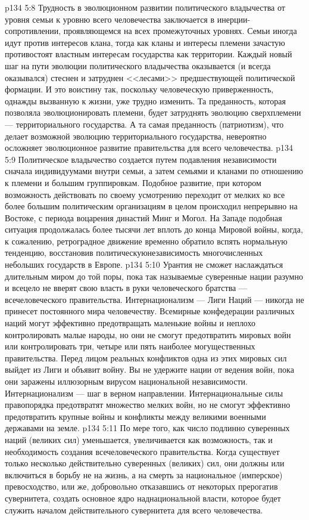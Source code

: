 \vs p134 5:8 Трудность в эволюционном развитии политического владычества от уровня семьи к уровню всего человечества заключается в инерции\hyp{}сопротивлении, проявляющемся на всех промежуточных уровнях. Семьи иногда идут против интересов клана, тогда как кланы и интересы племени зачастую противостоят властным интересам государства как территории. Каждый новый шаг на пути эволюции политического владычества оказывается (и всегда оказывался) стеснен и затруднен <<лесами>> предшествующей политической формации. И это воистину так, поскольку человеческую приверженность, однажды вызванную к жизни, уже трудно изменить. Та преданность, которая позволяла эволюционировать племени, будет затруднять эволюцию сверхплемени --- территориального государства. А та самая преданность (патриотизм), что делает возможной эволюцию территориального государства, невероятно осложняет эволюционное развитие правительства для всего человечества.
\vs p134 5:9 Политическое владычество создается путем подавления независимости сначала индивидуумами внутри семьи, а затем семьями и кланами по отношению к племени и большим группировкам. Подобное развитие, при котором возможность действовать по своему усмотрению переходит от мелких ко все более большим политическим организациям в целом происходил непрерывно на Востоке, с периода воцарения династий Минг и Могол. На Западе подобная ситуация продолжалась более тысячи лет вплоть до конца Мировой войны, когда, к сожалению, ретроградное движение временно обратило вспять нормальную тенденцию, восстановив политическуюнезависимость многочисленных небольших государств в Европе.
\vs p134 5:10 Урантия не сможет наслаждаться длительным миром до той поры, пока так называемые суверенные нации разумно и всецело не вверят свою власть в руки человеческого братства --- всечеловеческого правительства. Интернационализм --- Лиги Наций --- никогда не принесет постоянного мира человечеству. Всемирные конфедерации различных наций могут эффективно предотвращать маленькие войны и неплохо контролировать малые народы, но они не смогут предотвратить мировых войн или контролировать три, четыре или пять наиболее могущественных правительства. Перед лицом реальных конфликтов одна из этих мировых сил выйдет из Лиги и объявит войну. Вы не удержите нации от ведения войн, пока они заражены иллюзорным вирусом национальной независимости. Интернационализм --- шаг в верном направлении. Интернациональные силы правопорядка предотвратят множество мелких войн, но не смогут эффективно предотвратить крупные войны и конфликты между великими военными державами на земле.
\vs p134 5:11 По мере того, как число подлинно суверенных наций (великих сил) уменьшается, увеличивается как возможность, так и необходимость создания всечеловеческого правительства. Когда существует только несколько действительно суверенных (великих) сил, они должны или включиться в борьбу не на жизнь, а на смерть за национальное (имперское) превосходство, или же, добровольно отказавшись от некоторых прерогатив сувернитета, создать основное ядро наднациональной власти, которое будет служить началом действительного сувернитета для всего человечества.
